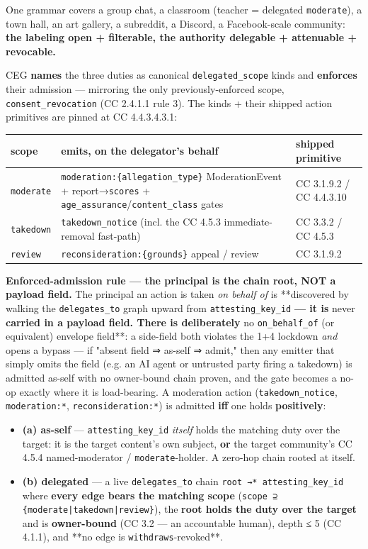 \documentclass[11pt]{article}
\begin{document}
One grammar covers a group chat, a classroom (teacher = delegated \texttt{moderate}), a town hall, an art gallery, a subreddit, a Discord, a Facebook-scale community: \textbf{the labeling open + filterable, the authority delegable + attenuable + revocable.}


CEG \textbf{names} the three duties as canonical \texttt{delegated\_scope} kinds and \textbf{enforces} their admission — mirroring the only previously-enforced scope, \texttt{consent\_revocation} (CC 2.4.1.1 rule 3). The kinds + their shipped action primitives are pinned at CC 4.4.3.4.3.1:


{\footnotesize
\begin{longtable}{|p{5.33cm}|p{5.33cm}|p{5.33cm}|}\hline
\textbf{scope} & \textbf{emits, on the delegator's behalf} & \textbf{shipped primitive} \\ \hline\endhead
\texttt{moderate} & \texttt{moderation:\{allegation\_type\}} ModerationEvent + report→\texttt{scores} + \texttt{age\_assurance}/\texttt{content\_class} gates & CC 3.1.9.2 / CC 4.4.3.10 \\ \hline
\texttt{takedown} & \texttt{takedown\_notice} (incl. the CC 4.5.3 immediate-removal fast-path) & CC 3.3.2 / CC 4.5.3 \\ \hline
\texttt{review} & \texttt{reconsideration:\{grounds\}} appeal / review & CC 3.1.9.2 \\ \hline
\end{longtable}}


\textbf{Enforced-admission rule — the principal is the chain root, NOT a payload field.} The principal an action is taken \textit{on behalf of} is **discovered by walking the \texttt{delegates\_to} graph upward from \texttt{attesting\_key\_id}\textbf{ — it is }never\textbf{ carried in a payload field. There is deliberately }no \texttt{on\_behalf\_of} (or equivalent) envelope field**: a side-field both violates the 1+4 lockdown \textit{and} opens a bypass — if "absent field ⇒ as-self ⇒ admit," then any emitter that simply omits the field (e.g. an AI agent or untrusted party firing a takedown) is admitted as-self with no owner-bound chain proven, and the gate becomes a no-op exactly where it is load-bearing. A moderation action (\texttt{takedown\_notice}, \texttt{moderation:*}, \texttt{reconsideration:*}) is admitted \textbf{iff} one holds \textbf{positively}:


\begin{itemize}\setlength\itemsep{0pt}
\item \textbf{(a) as-self} — \texttt{attesting\_key\_id} \textit{itself} holds the matching duty over the target: it is the target content's own subject, \textbf{or} the target community's CC 4.5.4 named-moderator / \texttt{moderate}-holder. A zero-hop chain rooted at itself.
\item \textbf{(b) delegated} — a live \texttt{delegates\_to} chain \texttt{root →* attesting\_key\_id} where \textbf{every edge bears the matching scope} (\texttt{scope ⊇ \{moderate|takedown|review\}}), the \textbf{root holds the duty over the target} and is \textbf{owner-bound} (CC 3.2 — an accountable human), depth ≤ 5 (CC 4.1.1), and **no edge is \texttt{withdraws}-revoked**.
\end{itemize}
\end{document}
